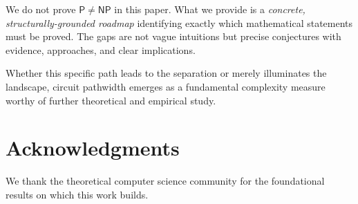 \documentclass[11pt]{article}
\theoremstyle{plain}
\theoremstyle{definition}
\newcommand{\Pclass}{\mathsf{P}}
\newcommand{\NP}{\mathsf{NP}}
\begin{document}
We do not prove $\Pclass \neq \NP$ in this paper. What we provide is a \emph{concrete, structurally-grounded roadmap} identifying exactly which mathematical statements must be proved. The gaps are not vague intuitions but precise conjectures with evidence, approaches, and clear implications.

Whether this specific path leads to the separation or merely illuminates the landscape, circuit pathwidth emerges as a fundamental complexity measure worthy of further theoretical and empirical study.


\section*{Acknowledgments}

We thank the theoretical computer science community for the foundational results on which this work builds.
\end{document}
